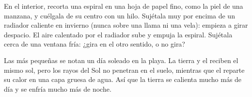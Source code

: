 \begin{inthelab}
En el interior, recorta una espiral en una hoja de papel fino, como la
piel de una manzana, y cuélgala de su centro con un hilo. Sujétala muy por
encima de un radiador caliente en invierno (nunca sobre una llama ni una
vela): empieza a girar despacio. El aire calentado por el radiador sube y
empuja la espiral. Sujétala cerca de una ventana fría: ¿gira en el otro
sentido, o no gira?
\end{inthelab}

Las  más pequeñas se notan un día soleado en la
playa. La tierra y el  reciben el mismo sol, pero los rayos del Sol no
penetran en el suelo, mientras que el  reparte su calor en una capa
gruesa de agua. Así que la tierra se calienta mucho más de día y se enfría
mucho más de noche.

